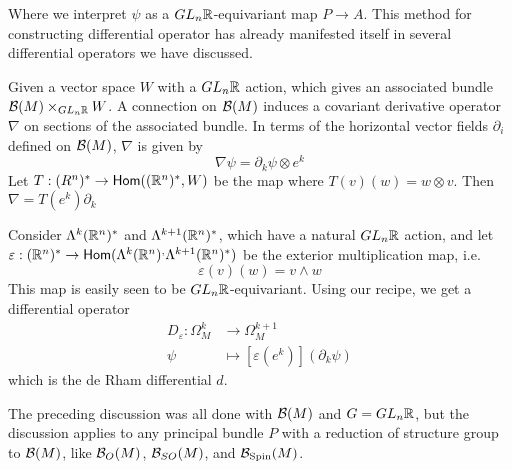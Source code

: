 Where we interpret $\psi$ as a $GL_n\mathbb{R}$-equivariant map $P \to A$.
%
This method for constructing differential operator has already manifested itself
in several differential operators we have discussed.
%
\begin{exmp}
 Given a vector space $W$ with a $GL_n\mathbb{R}$ action, which gives an associated
 bundle $\mathcal{B}(M) \times_{GL_n\mathbb{R}} W$. A connection on $\mathcal{B}(M)$ induces a
 covariant derivative operator $\nabla$ on sections of the associated bundle.
 In terms of the horizontal vector
 fields $\partial_i$ defined on $\mathcal{B}(M)$, $\nabla$ is given by
 \[
  \nabla\psi = \partial_k\psi \otimes e^k
 \]
 Let $T : (R^n)^* \to \mathsf{Hom}((\mathbb{R}^n)^*, W)$ be the map where $T(v)(w) = w \otimes v$.
 Then $\nabla = T(e^k)\partial_k$
\end{exmp}
%
\begin{exmp}
 Consider $\Lambda^k(\mathbb{R}^n)^*$ and $\Lambda^{k+1}(\mathbb{R}^n)^*$, which have a natural
 $GL_n\mathbb{R}$ action, and let
 $\varepsilon : (\mathbb{R}^n)^* \to \mathsf{Hom}(\Lambda^k(\mathbb{R}^n)^,\Lambda^{k+1}(\mathbb{R}^n)^*)$
 be the exterior multiplication map, i.e.
 \[
  \varepsilon(v)(w) = v \wedge w
 \]
 This map is easily seen to be $GL_n\mathbb{R}$-equivariant. Using our recipe, we get a
 differential operator
 \begin{align*}
  D_\varepsilon : \Omega^k_M & \to \Omega^{k+1}_M                         \\
  \psi                       & \mapsto [\varepsilon(e^k)](\partial_k\psi)
 \end{align*}
 which is the de Rham differential $d$.
\end{exmp}
%
The preceding discussion was all done with $\mathcal{B}(M)$ and $G = GL_n\mathbb{R}$, but the
discussion applies to any principal bundle $P$ with a reduction of structure
group to $\mathcal{B}(M)$, like $\mathcal{B}_O(M)$, $\mathcal{B}_{SO}(M)$, and $\mathcal{B}_{\mathrm{Spin}}(M)$. \\
%

